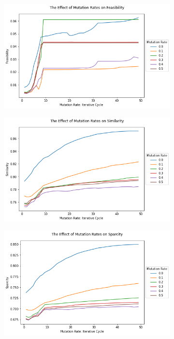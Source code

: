
\begin{figure}[htbp]
    \centering
    \begin{subfigure}[c]{0.49\textwidth}
        \centering
        \includegraphics[width=\textwidth]{figures/generated/exp2_feasibility.png}
        \label{fig:exp2-feasibility}    
    \end{subfigure}
    \hfill
    \begin{subfigure}[c]{0.49\textwidth}
        \centering
        \includegraphics[width=\textwidth]{figures/generated/exp2_similarity.png}
        \label{fig:exp2-similarity}
    \end{subfigure}
    \hfill
    \begin{subfigure}[c]{0.49\textwidth}
        \centering
        \includegraphics[width=\textwidth]{figures/generated/exp2_sparcity.png}

\end{subfigure}
\end{figure}
